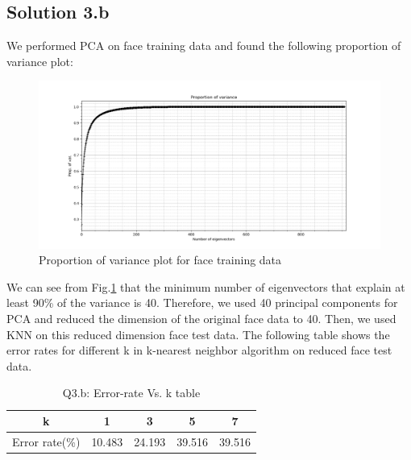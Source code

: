 \subsection*{Solution 3.b}
We performed PCA on face training data and found the following proportion of variance plot:
\begin{figure}[h!]
	\centering
	\includegraphics[scale=0.5]{pov_3b}
	\caption{Proportion of variance plot for face training data}
	\label{fig:pov_3b}
\end{figure}
\newline
We can see from Fig.\ref{fig:pov_3b} that the minimum number of eigenvectors that explain at least 90\% of the variance is 40.
\newline
Therefore, we used 40 principal components for PCA and reduced the dimension of the original face data to 40. Then, we used KNN on this reduced dimension face test data. The following table shows the error rates for different k in k-nearest neighbor algorithm on reduced face test data.
\begin{table}[h!]
	\begin{center}
		\begin{tabular}{||c | c | c | c | c ||} 
			\hline
			k & 1 & 3 & 5 & 7 \\ [0.5ex] 
			\hline\hline
			Error rate(\%) & 10.483 & 24.193 & 39.516 & 39.516 \\ [1ex]
			\hline
		\end{tabular}
	\end{center}
	\caption{Q3.b: Error-rate Vs. k table}
\end{table}
